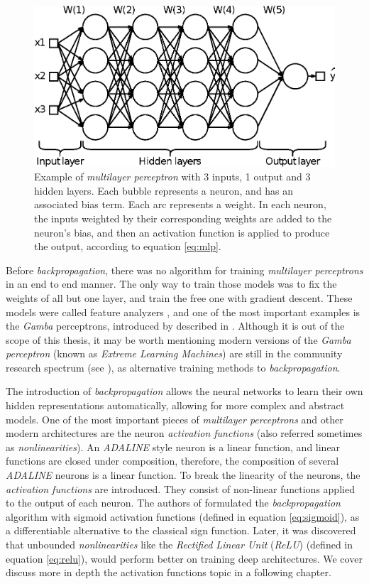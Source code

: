 \begin{figure}
	\centering
	\includegraphics[width=0.5\linewidth]{chapter2/images/mlp}
	\caption{Example of \textit{multilayer perceptron} with 3 inputs, 1 output and 3 hidden layers. Each bubble represents a neuron, and has an associated bias term. Each arc represents a weight. In each neuron, the inputs weighted by their corresponding weights are added to the neuron's bias, and then an activation function is applied to produce the output, according to equation \ref{eq:mlp}.}
	\label{fig:mlp}
\end{figure}


Before \textit{backpropagation}, there was no algorithm for training \textit{multilayer perceptrons} in an end to end manner. The only way to train those models was to fix the weights of all but one layer, and train the free one with gradient descent. These models were called feature analyzers \cite{hinton1986}, and one of the most important examples is the \textit{Gamba} perceptrons, introduced by described in \cite{minsky69perceptrons}. Although it is out of the scope of this thesis, it may be worth mentioning modern versions of the \textit{Gamba perceptron} (known as \textit{Extreme Learning Machines}) are still in the community research spectrum (see \cite{Huang2006, Huang2012}), as alternative training methods to \textit{backpropagation}.

The introduction of \textit{backpropagation} allows the neural networks to learn their own hidden representations automatically, allowing for more complex and abstract models. One of the most important pieces of \textit{multilayer perceptrons} and other modern architectures are the neuron \textit{activation functions} (also referred sometimes as \textit{nonlinearities}). An \textit{ADALINE} style neuron is a linear function, and linear functions are closed under composition, therefore, the composition of several \textit{ADALINE} neurons is a linear function. To break the linearity of the neurons, the \textit{activation functions} are introduced. They consist of non-linear functions applied to the output of each neuron. The authors of \cite{hinton1986} formulated the \textit{backpropagation} algorithm with sigmoid activation functions (defined in equation \ref{eq:sigmoid}), as a differentiable alternative to the classical sign function. Later, it was discovered that unbounded \textit{nonlinearities} like the \textit{Rectified Linear Unit} (\textit{ReLU}) \cite{nair2010} (defined in equation \ref{eq:relu}), would perform better on training deep architectures. We cover discuss more in depth the activation functions topic in a following chapter. %


